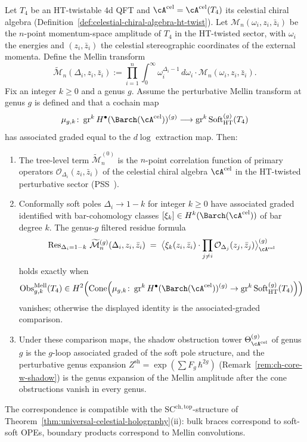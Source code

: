 \begin{proposition}
\label{prop:mellin-shadow-dictionary}
Let $T_4$ be an HT-twistable $4$d QFT and
$\cA^{\mathrm{cel}} = \cA^{\mathrm{cel}}(T_4)$ its celestial chiral
algebra (Definition~\ref{def:celestial-chiral-algebra-ht-twist}).
Let $\mathcal{M}_n(\omega_i,z_i,\bar z_i)$ be the $n$-point
momentum-space amplitude of $T_4$ in the HT-twisted sector, with
$\omega_i$ the energies and $(z_i,\bar z_i)$ the celestial
stereographic coordinates of the external momenta. Define the
Mellin transform
\[
\widetilde{\mathcal{M}}_n(\Delta_i,z_i,\bar z_i)
 := \prod_{i=1}^n \int_0^\infty \omega_i^{\Delta_i-1}\,d\omega_i\cdot
 \mathcal{M}_n(\omega_i,z_i,\bar z_i).
\]
Fix an integer \(k\ge0\) and a genus \(g\). Assume the perturbative Mellin transform at
genus \(g\) is defined and that a cochain map
\[
\mu_{g,k}\colon
\gr^kH^\bullet(\Barch(\cA^{\mathrm{cel}}))^{(g)}
\longrightarrow
\gr^k\mathrm{Soft}^{(g)}_{\mathrm{HT}}(T_4)
\]
has associated graded equal to the \(d\log\) extraction map. Then:
\begin{enumerate}[label=\textup{(\roman*)}]
\item The tree-level term \(\widetilde{\mathcal{M}}_n^{(0)}\) is the $n$-point correlation
function of primary operators $\mathcal{O}_{\Delta_i}(z_i,\bar z_i)$
of the celestial chiral algebra $\cA^{\mathrm{cel}}$ in the
HT-twisted perturbative sector
(PSS~\cite{PasterskiShaoStromingerFlatSpaceHolog}).
\item Conformally soft poles $\Delta_i \to 1 - k$ for integer $k\geq 0$
have associated graded identified with bar-cohomology classes
$[\xi_k] \in H^k(\Barch(\cA^{\mathrm{cel}}))$ of bar degree $k$.
The genus-\(g\) filtered residue formula
\[
\operatorname{Res}_{\Delta_i = 1-k}\,
\widetilde{\mathcal{M}}^{(g)}_n(\Delta_i,z_i,\bar z_i)
\;=\;
\bigl\langle \xi_k(z_i,\bar z_i)\cdot
 \prod_{j\neq i}\mathcal{O}_{\Delta_j}(z_j,\bar z_j)
\bigr\rangle_{\cA^{\mathrm{cel}}}^{(g)}
\]
holds exactly when
\[
\Obs^{\mathrm{Mell}}_{g,k}(T_4)
\in H^2\!\left(
\Cone\!\left(
\mu_{g,k}\colon
\gr^kH^\bullet(\Barch(\cA^{\mathrm{cel}}))^{(g)}
\to
\gr^k\mathrm{Soft}^{(g)}_{\mathrm{HT}}(T_4)
\right)\right)
\]
vanishes; otherwise the displayed identity is the associated-graded
comparison.
\item Under these comparison maps, the shadow obstruction tower
$\Theta_{\cA^{\mathrm{cel}}}^{(g)}$ of genus $g$ is the
$g$-loop associated graded of the soft pole structure, and the
perturbative genus expansion $Z^{\mathrm{sh}} = \exp(\sum F_g\,\hbar^{2g})$
(Remark~\ref{rem:ch-core-w-shadow}) is the genus expansion of the
Mellin amplitude after the cone obstructions vanish in every genus.
\end{enumerate}
The correspondence is compatible with the $\mathrm{SC}^{\mathrm{ch,top}}$-structure
of Theorem~\ref{thm:universal-celestial-holography}(ii): bulk braces
correspond to soft-soft OPEs, boundary products correspond to
Mellin convolutions.
\end{proposition}

